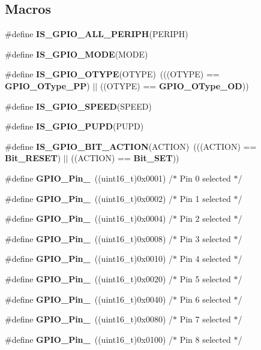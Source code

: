 \subsection*{Macros}
\begin{DoxyCompactItemize}
\item 
\#define \textbf{ I\+S\+\_\+\+G\+P\+I\+O\+\_\+\+A\+L\+L\+\_\+\+P\+E\+R\+I\+PH}(P\+E\+R\+I\+PH)
\item 
\#define \textbf{ I\+S\+\_\+\+G\+P\+I\+O\+\_\+\+M\+O\+DE}(M\+O\+DE)
\item 
\#define \textbf{ I\+S\+\_\+\+G\+P\+I\+O\+\_\+\+O\+T\+Y\+PE}(O\+T\+Y\+PE)~(((O\+T\+Y\+PE) == \textbf{ G\+P\+I\+O\+\_\+\+O\+Type\+\_\+\+PP}) $\vert$$\vert$ ((O\+T\+Y\+PE) == \textbf{ G\+P\+I\+O\+\_\+\+O\+Type\+\_\+\+OD}))
\item 
\#define \textbf{ I\+S\+\_\+\+G\+P\+I\+O\+\_\+\+S\+P\+E\+ED}(S\+P\+E\+ED)
\item 
\#define \textbf{ I\+S\+\_\+\+G\+P\+I\+O\+\_\+\+P\+U\+PD}(P\+U\+PD)
\item 
\#define \textbf{ I\+S\+\_\+\+G\+P\+I\+O\+\_\+\+B\+I\+T\+\_\+\+A\+C\+T\+I\+ON}(A\+C\+T\+I\+ON)~(((A\+C\+T\+I\+ON) == \textbf{ Bit\+\_\+\+R\+E\+S\+ET}) $\vert$$\vert$ ((A\+C\+T\+I\+ON) == \textbf{ Bit\+\_\+\+S\+ET}))
\item 
\#define \textbf{ G\+P\+I\+O\+\_\+\+Pin\+\_}~((uint16\+\_\+t)0x0001)  /$\ast$ Pin 0 selected $\ast$/
\item 
\#define \textbf{ G\+P\+I\+O\+\_\+\+Pin\+\_}~((uint16\+\_\+t)0x0002)  /$\ast$ Pin 1 selected $\ast$/
\item 
\#define \textbf{ G\+P\+I\+O\+\_\+\+Pin\+\_}~((uint16\+\_\+t)0x0004)  /$\ast$ Pin 2 selected $\ast$/
\item 
\#define \textbf{ G\+P\+I\+O\+\_\+\+Pin\+\_}~((uint16\+\_\+t)0x0008)  /$\ast$ Pin 3 selected $\ast$/
\item 
\#define \textbf{ G\+P\+I\+O\+\_\+\+Pin\+\_}~((uint16\+\_\+t)0x0010)  /$\ast$ Pin 4 selected $\ast$/
\item 
\#define \textbf{ G\+P\+I\+O\+\_\+\+Pin\+\_}~((uint16\+\_\+t)0x0020)  /$\ast$ Pin 5 selected $\ast$/
\item 
\#define \textbf{ G\+P\+I\+O\+\_\+\+Pin\+\_}~((uint16\+\_\+t)0x0040)  /$\ast$ Pin 6 selected $\ast$/
\item 
\#define \textbf{ G\+P\+I\+O\+\_\+\+Pin\+\_}~((uint16\+\_\+t)0x0080)  /$\ast$ Pin 7 selected $\ast$/
\item 
\#define \textbf{ G\+P\+I\+O\+\_\+\+Pin\+\_}~((uint16\+\_\+t)0x0100)  /$\ast$ Pin 8 selected $\ast$/

\end{DoxyCompactItemize}
